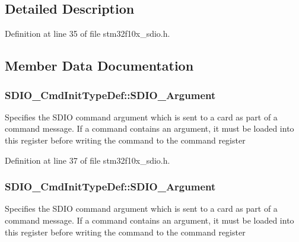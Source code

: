 \subsection{Detailed Description}


Definition at line 35 of file stm32f10x\+\_\+sdio.\+h.



\subsection{Member Data Documentation}
\subsubsection[{\texorpdfstring{S\+D\+I\+O\+\_\+\+Argument}{SDIO_Argument}}]{ S\+D\+I\+O\+\_\+\+Cmd\+Init\+Type\+Def\+::\+S\+D\+I\+O\+\_\+\+Argument}\hypertarget{struct_s_d_i_o___cmd_init_type_def_a805f2c603cbec687f2ecf8a0f0ce582b}{}\label{struct_s_d_i_o___cmd_init_type_def_a805f2c603cbec687f2ecf8a0f0ce582b}
Specifies the S\+D\+IO command argument which is sent to a card as part of a command message. If a command contains an argument, it must be loaded into this register before writing the command to the command register 

Definition at line 37 of file stm32f10x\+\_\+sdio.\+h.

\subsubsection[{\texorpdfstring{S\+D\+I\+O\+\_\+\+Argument}{SDIO_Argument}}]{ S\+D\+I\+O\+\_\+\+Cmd\+Init\+Type\+Def\+::\+S\+D\+I\+O\+\_\+\+Argument}\hypertarget{struct_s_d_i_o___cmd_init_type_def_a37dfc4d7191ec10cffdb05ecf58d4807}{}\label{struct_s_d_i_o___cmd_init_type_def_a37dfc4d7191ec10cffdb05ecf58d4807}
Specifies the S\+D\+IO command argument which is sent to a card as part of a command message. If a command contains an argument, it must be loaded into this register before writing the command to the command register 

